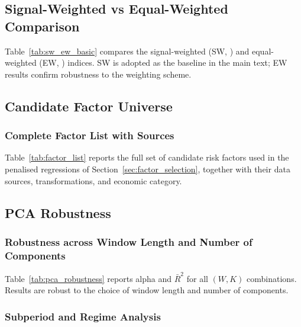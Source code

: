 \subsection{Signal-Weighted vs Equal-Weighted Comparison}
\label{app:sw_ew}

Table~\ref{tab:sw_ew_basic} compares the signal-weighted (SW,
\citealp{rebonato2021convexity}) and equal-weighted (EW,
\citealp{duarte2007risk}) indices. SW is adopted as the baseline in the
main text; EW results confirm robustness to the weighting scheme.




\subsection{Candidate Factor Universe}
\label{app:factors}

\subsubsection{Complete Factor List with Sources}
\label{app:factor_list}
Table~\ref{tab:factor_list} reports the full set of candidate risk
factors used in the penalised regressions of Section~\ref{sec:factor_selection}, together with
their data sources, transformations, and economic category.




\subsection{PCA Robustness}
\label{app:pca_robustness}

\subsubsection{Robustness across Window Length and Number of Components}
\label{app:pca_wk}

Table~\ref{tab:pca_robustness} reports alpha and $\bar{R}^2$ for all
$(W,K)$ combinations. Results are robust to the choice of window length
and number of components.



\subsubsection{Subperiod and Regime Analysis}
\label{app:pca_subperiod}

